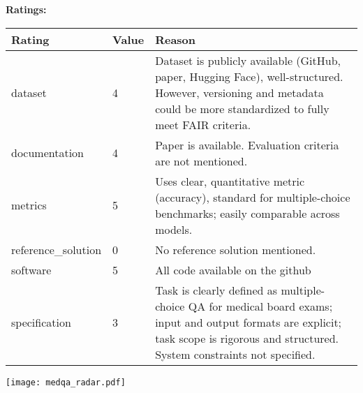 {{{\bf Ratings:} ~ \\

\begin{tabular}{p{} p{} p{}}
\hline
Rating & Value & Reason \\
\hline
dataset & 4 & Dataset is publicly available (GitHub, paper, Hugging Face), well-structured. However, versioning and metadata could be more standardized to fully meet FAIR criteria.
 \\
documentation & 4 & Paper is available. Evaluation criteria are not mentioned.
 \\
metrics & 5 & Uses clear, quantitative metric (accuracy), standard for multiple-choice benchmarks; easily comparable across models.
 \\
reference\_solution & 0 & No reference solution mentioned.
 \\
software & 5 & All code available on the github
 \\
specification & 3 & Task is clearly defined as multiple-choice QA for medical board exams; input and output formats are explicit; task scope is rigorous and structured. System constraints not specified.
 \\
\hline
\end{tabular}

\texttt{[image: medqa\_radar.pdf]}
}}
\clearpage